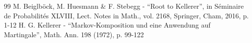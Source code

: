 \begin{thebibliography}{99}
 M. Beiglböck, M. Huesmann \& F. Stebegg - “Root to Kellerer”, in Séminaire de Probabilités XLVIII, Lect. Notes in Math., vol. 2168, Springer, Cham, 2016, p. 1-12
 H. G. Kellerer - “Markov-Komposition und eine Anwendung auf Martingale”, Math. Ann. 198 (1972), p. 99-122
\end{thebibliography}
